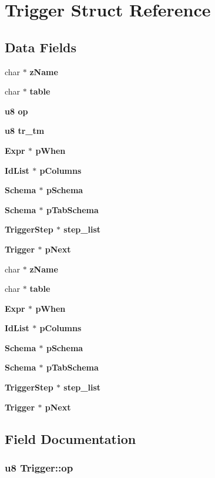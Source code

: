 \section{Trigger Struct Reference}
\label{structTrigger}
\subsection*{Data Fields}
\begin{CompactItemize}
\item 
char $\ast$ \bf{z\-Name}
\item 
char $\ast$ \bf{table}
\item 
\bf{u8} \bf{op}
\item 
\bf{u8} \bf{tr\_\-tm}
\item 
\bf{Expr} $\ast$ \bf{p\-When}
\item 
\bf{Id\-List} $\ast$ \bf{p\-Columns}
\item 
\bf{Schema} $\ast$ \bf{p\-Schema}
\item 
\bf{Schema} $\ast$ \bf{p\-Tab\-Schema}
\item 
\bf{Trigger\-Step} $\ast$ \bf{step\_\-list}
\item 
\bf{Trigger} $\ast$ \bf{p\-Next}
\item 
char $\ast$ \bf{z\-Name}
\item 
char $\ast$ \bf{table}
\item 
\bf{Expr} $\ast$ \bf{p\-When}
\item 
\bf{Id\-List} $\ast$ \bf{p\-Columns}
\item 
\bf{Schema} $\ast$ \bf{p\-Schema}
\item 
\bf{Schema} $\ast$ \bf{p\-Tab\-Schema}
\item 
\bf{Trigger\-Step} $\ast$ \bf{step\_\-list}
\item 
\bf{Trigger} $\ast$ \bf{p\-Next}
\end{CompactItemize}


\subsection{Field Documentation}
\subsubsection{\setlength{\rightskip}{0pt plus 5cm}\bf{u8} \bf{Trigger::op}}\label{structTrigger_e0e67b3a0986e32994956e6baa6ee8e2}


